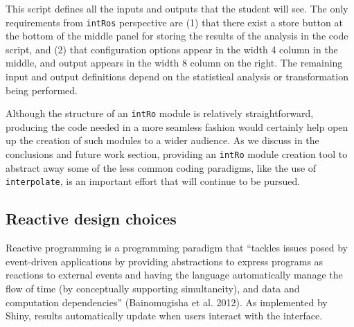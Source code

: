\documentclass[12pt,]{article}
\newenvironment{Shaded}{\begin{snugshade}}{\end{snugshade}}
\newcommand{\KeywordTok}[1]{\textcolor[rgb]{0.13,0.29,0.53}{\textbf{{#1}}}}
\newcommand{\DecValTok}[1]{\textcolor[rgb]{0.00,0.00,0.81}{{#1}}}
\newcommand{\StringTok}[1]{\textcolor[rgb]{0.31,0.60,0.02}{{#1}}}
\newcommand{\NormalTok}[1]{{#1}}
\begin{document}
\begin{Shaded}
\end{Shaded}

This script defines all the inputs and outputs that the student will
see. The only requirements from \texttt{intRo\textquotesingle{}s}
perspective are (1) that there exist a store button at the bottom of the
middle panel for storing the results of the analysis in the code script,
and (2) that configuration options appear in the width 4 column in the
middle, and output appears in the width 8 column on the right. The
remaining input and output definitions depend on the statistical
analysis or transformation being performed.

Although the structure of an \texttt{intRo} module is relatively
straightforward, producing the code needed in a more seamless fashion
would certainly help open up the creation of such modules to a wider
audience. As we discuss in the conclusions and future work section,
providing an \texttt{intRo} module creation tool to abstract away some
of the less common coding paradigms, like the use of
\texttt{interpolate}, is an important effort that will continue to be
pursued.

\subsection{Reactive design choices}\label{reactive-design-choices}

Reactive programming is a programming paradigm that ``tackles issues
posed by event-driven applications by providing abstractions to express
programs as reactions to external events and having the language
automatically manage the flow of time (by conceptually supporting
simultaneity), and data and computation dependencies'' (Bainomugisha et
al. 2012). As implemented by Shiny, results automatically update when
users interact with the interface.
\end{document}
